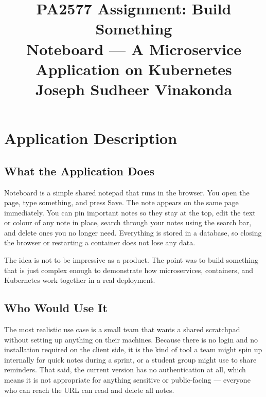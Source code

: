 \documentclass[12pt,a4paper]{article}
\title{
    \textbf{\Large PA2577 Assignment: Build Something}\\[0.6em]
    \large Noteboard --- A Microservice Application on Kubernetes\\[1em]
    \normalsize Joseph Sudheer Vinakonda
}
\author{}
\date{}
\begin{document}

\maketitle
\thispagestyle{empty}
\vspace{-1em}
\tableofcontents
\newpage

\section{Application Description}

\subsection{What the Application Does}

Noteboard is a simple shared notepad that runs in the browser. You open the page, type something, and press Save. The note appears on the same page immediately. You can pin important notes so they stay at the top, edit the text or colour of any note in place, search through your notes using the search bar, and delete ones you no longer need. Everything is stored in a database, so closing the browser or restarting a container does not lose any data.

The idea is not to be impressive as a product. The point was to build something that is just complex enough to demonstrate how microservices, containers, and Kubernetes work together in a real deployment.

\subsection{Who Would Use It}

The most realistic use case is a small team that wants a shared scratchpad without setting up anything on their machines. Because there is no login and no installation required on the client side, it is the kind of tool a team might spin up internally for quick notes during a sprint, or a student group might use to share reminders. That said, the current version has no authentication at all, which means it is not appropriate for anything sensitive or public-facing --- everyone who can reach the URL can read and delete all notes.
\end{document}
